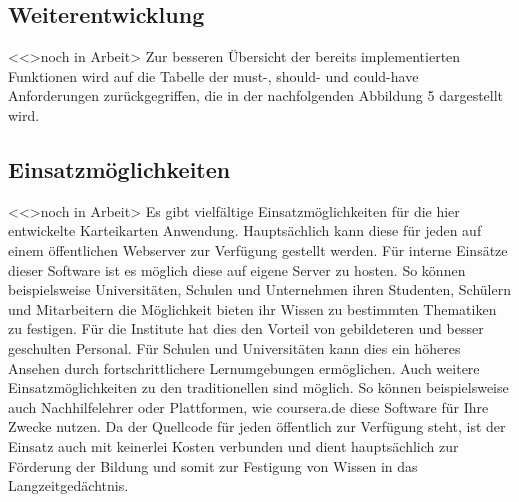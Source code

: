 \subsection{Weiterentwicklung}
<<>noch in Arbeit>
Zur besseren Übersicht der bereits implementierten Funktionen wird auf die Tabelle der must-, should- und could-have Anforderungen zurückgegriffen, die in der nachfolgenden Abbildung 5 dargestellt wird.




\subsection{Einsatzmöglichkeiten}
<<>noch in Arbeit>
Es gibt vielfältige Einsatzmöglichkeiten für die hier entwickelte Karteikarten Anwendung. Hauptsächlich kann diese für jeden auf einem öffentlichen Webserver zur Verfügung gestellt werden. Für interne Einsätze dieser Software ist es möglich diese auf eigene Server zu hosten. So können beispielsweise Universitäten, Schulen und Unternehmen ihren Studenten, Schülern und Mitarbeitern die Möglichkeit bieten ihr Wissen zu bestimmten Thematiken zu festigen. Für die Institute hat dies den Vorteil von gebildeteren und besser geschulten Personal. Für Schulen und Universitäten kann dies ein höheres Ansehen durch fortschrittlichere Lernumgebungen ermöglichen. Auch weitere Einsatzmöglichkeiten zu den traditionellen sind möglich. So können beispielsweise auch Nachhilfelehrer oder Plattformen, wie coursera.de diese Software für Ihre Zwecke nutzen. Da der Quellcode für jeden öffentlich zur Verfügung steht, ist der Einsatz auch mit keinerlei Kosten verbunden und dient hauptsächlich zur Förderung der Bildung und somit zur Festigung von Wissen in das Langzeitgedächtnis.


